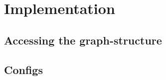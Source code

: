 \section{Implementation}
\label{chap:balancing:implementation}


    \subsection{Accessing the graph-structure}


    \subsection{Configs}

